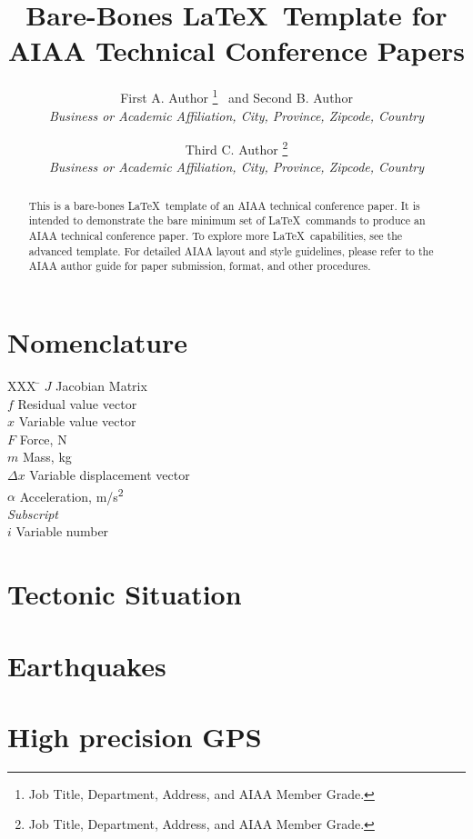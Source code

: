 \documentclass[]{aiaa-tc}%
\title{Bare-Bones \LaTeX\ Template for\\
        AIAA Technical Conference Papers}
\author{
  First A. Author%
    \thanks{Job Title, Department, Address, and AIAA Member Grade.}
  \ and Second B. Author\thanksibid{1}\\
  {\normalsize\itshape
   Business or Academic Affiliation, City, Province, Zipcode, Country}\\
  \and
  Third C. Author%
   \thanks{Job Title, Department, Address, and AIAA Member Grade.}\\
  {\normalsize\itshape
  Business or Academic Affiliation, City, Province, Zipcode, Country}
 }
\begin{document}
\maketitle

\begin{abstract}
This is a bare-bones \LaTeX\ template of an AIAA technical conference paper.
It is intended to demonstrate the bare minimum set of \LaTeX\ commands
to produce an AIAA technical conference paper.
To explore more \LaTeX\ capabilities, see the advanced template.
For detailed AIAA layout and style guidelines, please refer to the AIAA
author guide for paper submission, format, and other procedures.
\end{abstract}

\section*{Nomenclature}

\begin{tabbing}
  XXX \= \kill%
  $J$ \> Jacobian Matrix \\
  $f$ \> Residual value vector \\
  $x$ \> Variable value vector \\
  $F$ \> Force, N \\
  $m$ \> Mass, kg \\
  $\Delta x$ \> Variable displacement vector \\
  $\alpha$ \> Acceleration, m/s\textsuperscript{2} \\[5pt]
  \textit{Subscript}\\
  $i$ \> Variable number \\
 \end{tabbing}

\section{Tectonic Situation}

\section{Earthquakes}
\section{High precision GPS}
\end{document}
